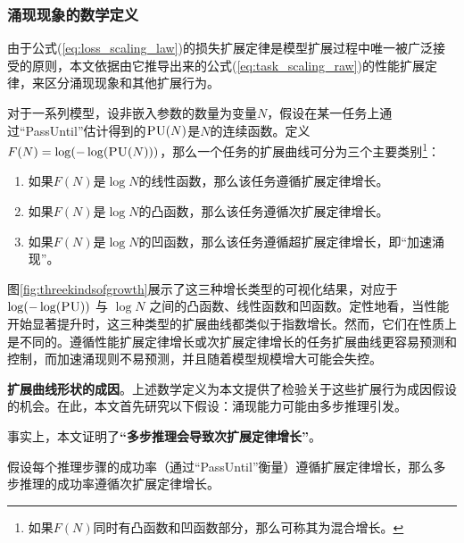 \subsubsection{涌现现象的数学定义}
由于公式(\ref{eq:loss_scaling_law})的损失扩展定律是模型扩展过程中唯一被广泛接受的原则，本文依据由它推导出来的公式(\ref{eq:task_scaling_raw})的性能扩展定律，来区分涌现现象和其他扩展行为。


对于一系列模型，设非嵌入参数的数量为变量\(N\)，假设在某一任务上通过“PassUntil”估计得到的\(\textsc{PU}(N)\)是\(N\)的连续函数。定义\(F(N) = \operatorname{log}(-\operatorname{log}(\textsc{PU}(N)))\)，{那么一个任务的扩展曲线可分为三个主要类别\footnote{如果\(F(N)\)同时有凸函数和凹函数部分，那么可称其为混合增长。}：}
\begin{enumerate}
    \item 如果\(F(N)\)是\(\operatorname{log}N\)的线性函数，那么该任务遵循扩展定律增长。
    \item 如果\(F(N)\)是\(\operatorname{log}N\)的凸函数，那么该任务遵循次扩展定律增长。
    \item 如果\(F(N)\)是\(\operatorname{log}N\)的凹函数，那么该任务遵循超扩展定律增长，即“加速涌现”。
\end{enumerate}


图\ref{fig:threekindsofgrowth}展示了这三种增长类型的可视化结果，对应于 $\log(-\log(\textsc{PU}))$ 与 $\log N$ 之间的凸函数、线性函数和凹函数。定性地看，当性能开始显著提升时，这三种类型的扩展曲线都类似于指数增长。然而，它们在性质上是不同的。遵循性能扩展定律增长或次扩展定律增长的任务扩展曲线更容易预测和控制，而加速涌现则不易预测，并且随着模型规模增大可能会失控。

{\textbf{扩展曲线形状的成因}。上述数学定义为本文提供了检验关于这些扩展行为成因假设的机会。在此，本文首先研究以下假设：涌现能力可能由多步推理引发\citep{srivastava2022beyond, wei2022emergent, schaeffer2023emergent}。}

事实上，本文证明了\textbf{“多步推理会导致次扩展定律增长”}。

\begin{theorem}
假设每个推理步骤的成功率（通过“PassUntil”衡量）遵循扩展定律增长，那么多步推理的成功率遵循次扩展定律增长。
\end{theorem}


